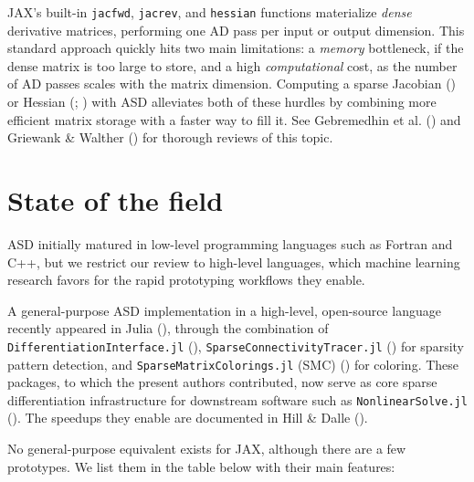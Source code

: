 \documentclass[
]{article}
\begin{document}
JAX's built-in \texttt{jacfwd}, \texttt{jacrev}, and \texttt{hessian}
functions materialize \emph{dense} derivative matrices, performing one
AD pass per input or output dimension. This standard approach quickly
hits two main limitations: a \emph{memory} bottleneck, if the dense
matrix is too large to store, and a high \emph{computational} cost, as
the number of AD passes scales with the matrix dimension. Computing a
sparse Jacobian () or Hessian (; ) with ASD
alleviates both of these hurdles by combining more efficient matrix
storage with a faster way to fill it. See Gebremedhin et al.
() and Griewank \& Walther
() for thorough reviews
of this topic.

\section{State of the field}\label{state-of-the-field}

ASD initially matured in low-level programming languages such as Fortran
and C++, but we restrict our review to high-level languages, which
machine learning research favors for the rapid prototyping workflows
they enable.

A general-purpose ASD implementation in a high-level, open-source
language recently appeared in Julia
(), through the
combination of \texttt{DifferentiationInterface.jl}
(),
\texttt{SparseConnectivityTracer.jl}
() for sparsity
pattern detection, and \texttt{SparseMatrixColorings.jl} (SMC)
() for coloring. These packages, to which the present authors
contributed, now serve as core sparse differentiation infrastructure for
downstream software such as \texttt{NonlinearSolve.jl}
(). The speedups
they enable are documented in Hill \& Dalle
().

No general-purpose equivalent exists for JAX, although there are a few
prototypes. We list them in the table below with their main features:
\end{document}

